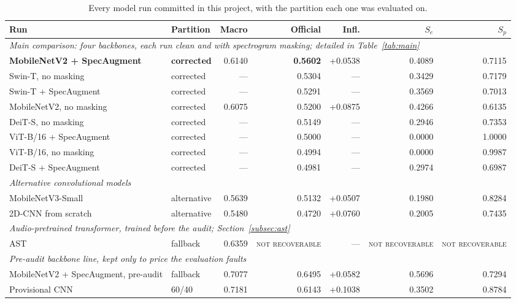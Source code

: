 \documentclass[journal,onecolumn]{IEEEtran}
\newcommand{\best}[1]{\textbf{#1}}
\newcommand{\notrec}{\textsc{not recoverable}}
\begin{document}
\begin{table}[hbtp]
\centering
\caption{Every model run committed in this project, with the partition each one was evaluated on.}
\label{tab:allruns}
\footnotesize
\begin{tabular}{llrrrrr}
\toprule
Run & Partition & Macro & \best{Official} & Infl. & $S_e$ & $S_p$ \\
\midrule
\multicolumn{7}{l}{\emph{Main comparison: four backbones, each run clean and with spectrogram masking; detailed in Table~\ref{tab:main}}}\\
\best{MobileNetV2 + SpecAugment} & \best{corrected} & 0.6140 & \best{0.5602} & +0.0538 & 0.4089 & 0.7115 \\
Swin-T, no masking          & corrected & --- & 0.5304 & --- & 0.3429 & 0.7179 \\
Swin-T + SpecAugment        & corrected & --- & 0.5291 & --- & 0.3569 & 0.7013 \\
MobileNetV2, no masking     & corrected & 0.6075 & 0.5200 & +0.0875 & 0.4266 & 0.6135 \\
DeiT-S, no masking          & corrected & --- & 0.5149 & --- & 0.2946 & 0.7353 \\
ViT-B/16 + SpecAugment      & corrected & --- & 0.5000 & --- & 0.0000 & 1.0000 \\
ViT-B/16, no masking        & corrected & --- & 0.4994 & --- & 0.0000 & 0.9987 \\
DeiT-S + SpecAugment        & corrected & --- & 0.4981 & --- & 0.2974 & 0.6987 \\
\midrule
\multicolumn{7}{l}{\emph{Alternative convolutional models}}\\
MobileNetV3-Small           & alternative & 0.5639 & 0.5132 & +0.0507 & 0.1980 & 0.8284 \\
2D-CNN from scratch         & alternative & 0.5480 & 0.4720 & +0.0760 & 0.2005 & 0.7435 \\
\midrule
\multicolumn{7}{l}{\emph{Audio-pretrained transformer, trained before the audit; Section~\ref{subsec:ast}}}\\
AST                         & fallback & 0.6359 & \notrec & --- & \notrec & \notrec \\
\midrule
\multicolumn{7}{l}{\emph{Pre-audit backbone line, kept only to price the evaluation faults}}\\
MobileNetV2 + SpecAugment, pre-audit & fallback & 0.7077 & 0.6495 & +0.0582 & 0.5696 & 0.7294 \\
Provisional CNN             & 60/40    & 0.7181 & 0.6143 & +0.1038 & 0.3502 & 0.8784 \\

\end{tabular}
\end{table}
\end{document}

